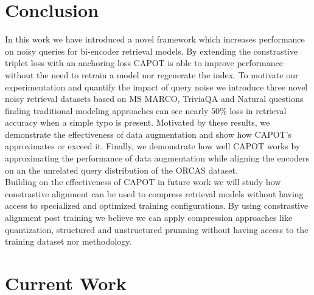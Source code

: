 \section{Conclusion}
In this work we have introduced a novel framework which increases performance on noisy queries for bi-encoder retrieval models. By extending the constrastive triplet loss with an anchoring loss CAPOT is able to improve performance without the need to retrain a model nor regenerate the index. To motivate our experimentation and quantify the impact of query noise we introduce three novel noisy retrieval datasets based on MS MARCO, TriviaQA and Natural questions finding traditional modeling approaches can see nearly 50\% loss in retrieval accuracy when a simple typo is present. Motivated by these results, we demonstrate the effectiveness of data augmentation and show how CAPOT's approximates or exceed it. Finally, we demonstrate how well  CAPOT works by approximating the performance of data augmentation while aligning the encoders on an the unrelated query distribution of the ORCAS dataset. \\
Building on the effectiveness of CAPOT in future work we will study how constrastive alignment can be used to compress retrieval models without having access to specialized and optimized training configurations. By using constrastive alignment post training we believe we can apply compression approaches like quantization, structured and unstructured prunning without having access to the training dataset nor methodology.  
\section{Current Work}

